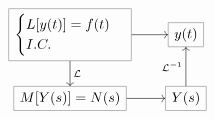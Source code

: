  
 \usepackage{tikz-cd}

   \[
    \begin{tikzcd}[cells={nodes={draw=gray}}]
        \begin{cases}
          L [ y(t) ] = f(t) \\
        I.C.
       \end{cases}
      \arrow[r] 
      \arrow[d,"\mathcal{L}"] 
      & 
      y(t)
      \\
        M [ Y(s) ] = N(s)
      \arrow[r] 
      & Y(s)
    \arrow[u, "\mathcal{L}^{-1}"]       
    \end{tikzcd}
    \]
